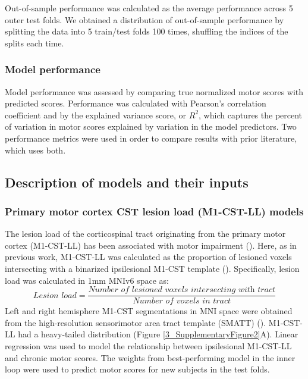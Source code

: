 \documentclass[phd,tocprelim]{cornell}
\begin{document}
Out-of-sample performance was calculated as the average performance across 5 outer test folds. We obtained a distribution of out-of-sample performance by splitting the data into 5 train/test folds 100 times, shuffling the indices of the splits each time. 

\subsubsection{Model performance}
Model performance was assessed by comparing true normalized motor scores with predicted scores. Performance was calculated with Pearson's correlation coefficient and by the explained variance score, or $R^2$, which captures the percent of variation in motor scores explained by variation in the model predictors. Two performance metrics were used in order to compare results with prior literature, which uses both.

\subsection{Description of models and their inputs}
\subsubsection{Primary motor cortex CST lesion load (M1-CST-LL) models}

The lesion load of the corticospinal tract originating from the primary motor cortex (M1-CST-LL) has been associated with motor impairment (\cite{Stinear2017-eg}). Here, as in previous work, M1-CST-LL was calculated as the proportion of lesioned voxels intersecting with a binarized ipsilesional M1-CST template (\cite{Zhu2010-qh}). Specifically, lesion load was calculated in 1mm MNIv6 space as:
\begin{equation}
    \textit{Lesion load} = \frac{\textit{Number of lesioned voxels intersecting with  tract}}{\textit{Number of voxels in tract}}
\end{equation}
Left and right hemisphere M1-CST segmentations in MNI space were obtained from the high-resolution sensorimotor area tract template (SMATT) (\cite{Archer2018-ti}). M1-CST-LL had a heavy-tailed distribution (Figure \ref{3_SupplementaryFigure2}A).
Linear regression was used to model the relationship between ipsilesional M1-CST-LL and chronic motor scores. The weights from best-performing model in the inner loop were used to predict motor scores for new subjects in the test folds. 
\end{document}
